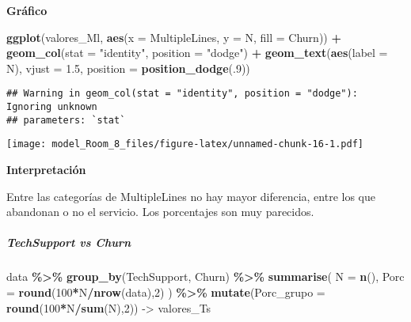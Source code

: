 \documentclass[
]{article}
\newenvironment{Shaded}{\begin{snugshade}}{\end{snugshade}}
\newcommand{\AttributeTok}[1]{\textcolor[rgb]{0.13,0.29,0.53}{#1}}
\newcommand{\DecValTok}[1]{\textcolor[rgb]{0.00,0.00,0.81}{#1}}
\newcommand{\FloatTok}[1]{\textcolor[rgb]{0.00,0.00,0.81}{#1}}
\newcommand{\FunctionTok}[1]{\textcolor[rgb]{0.13,0.29,0.53}{\textbf{#1}}}
\newcommand{\NormalTok}[1]{#1}
\newcommand{\OtherTok}[1]{\textcolor[rgb]{0.56,0.35,0.01}{#1}}
\newcommand{\SpecialCharTok}[1]{\textcolor[rgb]{0.81,0.36,0.00}{\textbf{#1}}}
\newcommand{\StringTok}[1]{\textcolor[rgb]{0.31,0.60,0.02}{#1}}
\begin{document}
\textbf{Gráfico}

\begin{Shaded}
\begin{Highlighting}[]
\FunctionTok{ggplot}\NormalTok{(valores\_Ml, }\FunctionTok{aes}\NormalTok{(}\AttributeTok{x =}\NormalTok{ MultipleLines, }\AttributeTok{y =}\NormalTok{ N, }\AttributeTok{fill =}\NormalTok{ Churn)) }\SpecialCharTok{+}
  \FunctionTok{geom\_col}\NormalTok{(}\AttributeTok{stat =} \StringTok{"identity"}\NormalTok{, }\AttributeTok{position =} \StringTok{"dodge"}\NormalTok{) }\SpecialCharTok{+}
  \FunctionTok{geom\_text}\NormalTok{(}\FunctionTok{aes}\NormalTok{(}\AttributeTok{label =}\NormalTok{ N), }\AttributeTok{vjust =} \FloatTok{1.5}\NormalTok{,}
            \AttributeTok{position =} \FunctionTok{position\_dodge}\NormalTok{(.}\DecValTok{9}\NormalTok{))}
\end{Highlighting}
\end{Shaded}

\begin{verbatim}
## Warning in geom_col(stat = "identity", position = "dodge"): Ignoring unknown
## parameters: `stat`
\end{verbatim}

\texttt{[image: model\_Room\_8\_files/figure-latex/unnamed-chunk-16-1.pdf]}

\textbf{Interpretación}

Entre las categorías de MultipleLines no hay mayor diferencia, entre los
que abandonan o no el servicio. Los porcentajes son muy parecidos.

\hypertarget{techsupport-vs-churn}{%
\subparagraph{TechSupport vs Churn}\label{techsupport-vs-churn}}

\begin{Shaded}
\begin{Highlighting}[]
\NormalTok{data }\SpecialCharTok{\%\textgreater{}\%}
  \FunctionTok{group\_by}\NormalTok{(TechSupport, Churn) }\SpecialCharTok{\%\textgreater{}\%}
  \FunctionTok{summarise}\NormalTok{(}
    \AttributeTok{N =} \FunctionTok{n}\NormalTok{(),}
    \AttributeTok{Porc =} \FunctionTok{round}\NormalTok{(}\DecValTok{100}\SpecialCharTok{*}\NormalTok{N}\SpecialCharTok{/}\FunctionTok{nrow}\NormalTok{(data),}\DecValTok{2}\NormalTok{)}
\NormalTok{  ) }\SpecialCharTok{\%\textgreater{}\%}
  \FunctionTok{mutate}\NormalTok{(}\AttributeTok{Porc\_grupo =} \FunctionTok{round}\NormalTok{(}\DecValTok{100}\SpecialCharTok{*}\NormalTok{N}\SpecialCharTok{/}\FunctionTok{sum}\NormalTok{(N),}\DecValTok{2}\NormalTok{)) }\OtherTok{{-}\textgreater{}}\NormalTok{ valores\_Ts}
\end{Highlighting}
\end{Shaded}
\end{document}
